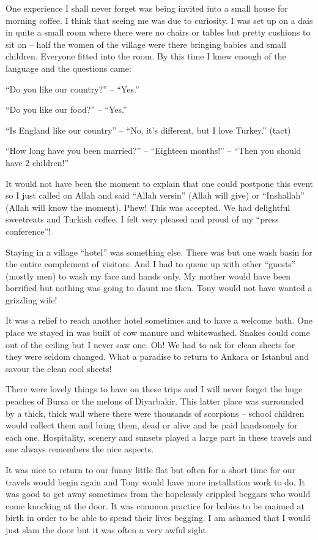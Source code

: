 One experience I shall never forget was being invited into a small
house for morning coffee. I think that seeing me was due to
curiosity. I was set up on a dais in quite a small room where there
were no chairs or tables but pretty cushions to sit on -- half the
women of the village were there bringing babies and small
children. Everyone fitted into the room. By this time I knew enough of
the language and the questions came:

``Do you like our country?'' -- ``Yes.''

``Do you like our food?'' -- ``Yes.''

``Is England like our country'' -- ``No, it's different, but I love
Turkey.'' (tact)

``How long have you been married?'' -- ``Eighteen months!'' -- ``Then
you should have 2 children!''

It would not have been the moment to explain that one could postpone
this event so I just called on Allah and said ``Allah versin'' (Allah
will give) or ``Inshallah'' (Allah will know the moment). Phew!  This
was accepted. We had delightful sweetreats and Turkish coffee. I felt
very pleased and proud of my ``press conference''!

Staying in a village ``hotel'' was something else. There was but one
wash basin for the entire complement of visitors. And I had to queue
up with other ``guests'' (mostly men) to wash my face and hands
only. My mother would have been horrified but nothing was going to
daunt me then. Tony would not have wanted a grizzling wife!

It was a relief to reach another hotel sometimes and to have a welcome
bath. One place we stayed in was built of cow manure and
whitewashed. Snakes could come out of the ceiling but I never saw
one. Oh! We had to ask for clean sheets for they were seldom
changed. What a paradise to return to Ankara or Istanbul and savour
the clean cool sheets!

There were lovely things to have on these trips and I will never
forget the huge peaches of Bursa or the melons of Diyarbakir. This
latter place was surrounded by a thick, thick wall where there were
thousands of scorpions -- school children would collect them and bring
them, dead or alive and be paid handsomely for each one. Hospitality,
scenery and sunsets played a large part in these travels and one
always remembers the nice aspects.

It was nice to return to our funny little flat but often for a short
time for our travels would begin again and Tony would have more
installation work to do. It was good to get away sometimes from the
hopelessly crippled beggars who would come knocking at the door. It
was common practice for babies to be maimed at birth in order to be
able to spend their lives begging. I am ashamed that I would just slam
the door but it was often a very awful sight.

